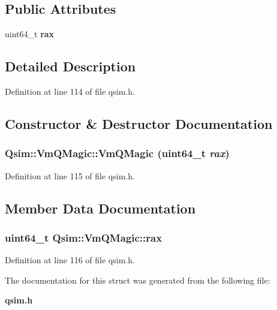 \subsection*{Public Attributes}
\begin{CompactItemize}
\item 
uint64\_\-t {\bf rax}
\end{CompactItemize}


\subsection{Detailed Description}


Definition at line 114 of file qsim.h.

\subsection{Constructor \& Destructor Documentation}
\subsubsection[{VmQMagic}]{\setlength{\rightskip}{0pt plus 5cm}Qsim::VmQMagic::VmQMagic (uint64\_\-t {\em rax})\hspace{0.3cm}{\tt  [inline]}}\label{structQsim_1_1VmQMagic_f1b7480c9f5851f5d627180ee2178e33}




Definition at line 115 of file qsim.h.

\subsection{Member Data Documentation}
\subsubsection[{rax}]{\setlength{\rightskip}{0pt plus 5cm}uint64\_\-t {\bf Qsim::VmQMagic::rax}}\label{structQsim_1_1VmQMagic_a4865a01758678087e66d31c5c02f776}




Definition at line 116 of file qsim.h.

The documentation for this struct was generated from the following file:\begin{CompactItemize}
\item 
{\bf qsim.h}\end{CompactItemize}
